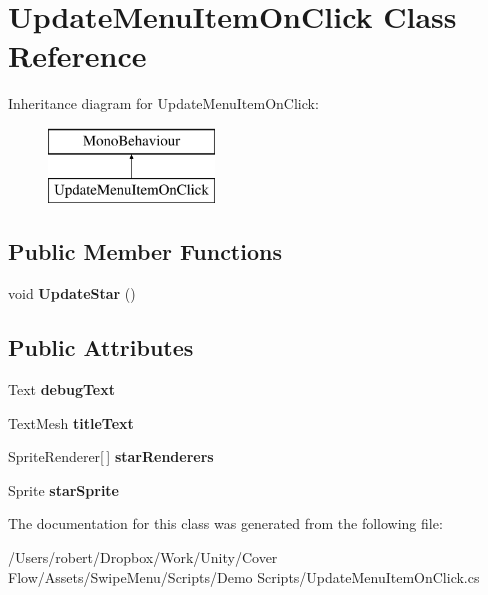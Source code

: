\hypertarget{class_update_menu_item_on_click}{}\section{Update\+Menu\+Item\+On\+Click Class Reference}
\label{class_update_menu_item_on_click}
Inheritance diagram for Update\+Menu\+Item\+On\+Click\+:\begin{figure}[H]
\begin{center}
\leavevmode
\includegraphics[height=2.000000cm]{class_update_menu_item_on_click}
\end{center}
\end{figure}
\subsection*{Public Member Functions}
\begin{DoxyCompactItemize}
\item 
\hypertarget{class_update_menu_item_on_click_a1db5470f63586fa0d7880e5b3dde80f3}{}void {\bfseries Update\+Star} ()\label{class_update_menu_item_on_click_a1db5470f63586fa0d7880e5b3dde80f3}

\end{DoxyCompactItemize}
\subsection*{Public Attributes}
\begin{DoxyCompactItemize}
\item 
\hypertarget{class_update_menu_item_on_click_a70ed820b658bf493872e1683afd74cfe}{}Text {\bfseries debug\+Text}\label{class_update_menu_item_on_click_a70ed820b658bf493872e1683afd74cfe}

\item 
\hypertarget{class_update_menu_item_on_click_a5f84b29440335cdbbaf7fba2cd5f182b}{}Text\+Mesh {\bfseries title\+Text}\label{class_update_menu_item_on_click_a5f84b29440335cdbbaf7fba2cd5f182b}

\item 
\hypertarget{class_update_menu_item_on_click_ac7ce1a1094bb394532201c4ec7ee3e92}{}Sprite\+Renderer\mbox{[}$\,$\mbox{]} {\bfseries star\+Renderers}\label{class_update_menu_item_on_click_ac7ce1a1094bb394532201c4ec7ee3e92}

\item 
\hypertarget{class_update_menu_item_on_click_a13ba5d5766bae0c79a2483ae5b749f35}{}Sprite {\bfseries star\+Sprite}\label{class_update_menu_item_on_click_a13ba5d5766bae0c79a2483ae5b749f35}

\end{DoxyCompactItemize}


The documentation for this class was generated from the following file\+:\begin{DoxyCompactItemize}
\item 
/\+Users/robert/\+Dropbox/\+Work/\+Unity/\+Cover Flow/\+Assets/\+Swipe\+Menu/\+Scripts/\+Demo Scripts/Update\+Menu\+Item\+On\+Click.\+cs\end{DoxyCompactItemize}
